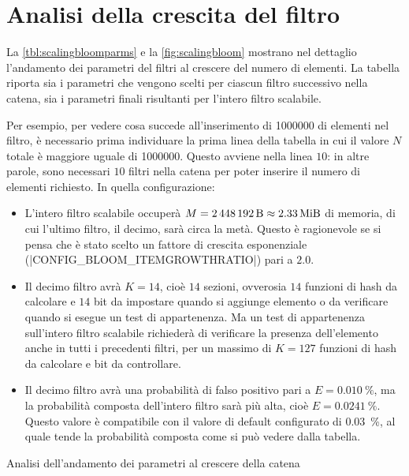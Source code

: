 \section{Analisi della crescita del filtro}

La \autoref{tbl:scalingbloomparms} e la \autoref{fig:scalingbloom} mostrano nel dettaglio
l'andamento dei parametri del filtri al crescere del numero di elementi. La tabella riporta sia i
parametri che vengono scelti per ciascun filtro successivo nella catena, sia i parametri finali
risultanti per l'intero filtro scalabile.

Per esempio, per vedere cosa succede all'inserimento di \num{1000000} di elementi nel filtro,
è necessario prima individuare la prima linea della tabella in cui il valore $N$ totale è maggiore
uguale di \num{1000000}. Questo avviene nella linea $10$: in altre parole, sono necessari $10$
filtri nella catena per poter inserire il numero di elementi richiesto. In quella configurazione:

\medskip
\begin{itemize}
  \item L'intero filtro scalabile occuperà $M = \SI{2448192}{\byte} \approx \SI{2.33}{\mebi\byte}$
  di memoria, di cui l'ultimo filtro, il decimo, sarà circa la metà. Questo è ragionevole se si
  pensa che è stato scelto un fattore di crescita esponenziale (\cverb|CONFIG_BLOOM_ITEMGROWTHRATIO|)
  pari a $2.0$.

  \item Il decimo filtro avrà $K=14$, cioè $14$ sezioni, ovverosia $14$ funzioni di hash da
  calcolare e $14$ bit da impostare quando si aggiunge elemento o da verificare quando si esegue un
  test di appartenenza. Ma un test di appartenenza sull'intero filtro scalabile richiederà di
  verificare la presenza dell'elemento anche in tutti i precedenti filtri, per un massimo di $K=127$
  funzioni di hash da calcolare e bit da controllare.

  \item Il decimo filtro avrà una probabilità di falso positivo pari a $E = \SI{0.010}{\%}$, ma la
  probabilità composta dell'intero filtro sarà più alta, cioè $E = \SI{0.0241}{\%}$. Questo valore è
  compatibile con il valore di default configurato di \SI{0.03}{\%}, al quale tende la probabilità
  composta come si può vedere dalla tabella.
\end{itemize}

\begin{table}[htb]
  \centering
  \hspace*{-2cm}
  
  \caption{Analisi dell'andamento dei parametri al crescere della catena}
  \label{tbl:scalingbloomparms}
  \hspace*{-2cm}
\end{table}

